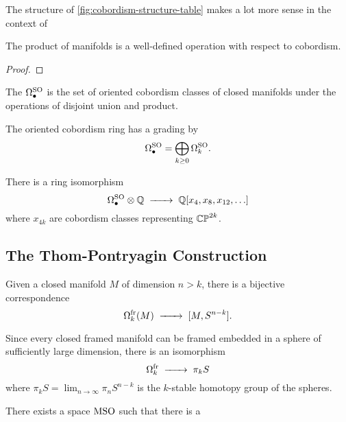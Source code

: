 The structure of \cref{fig:cobordism-structure-table} makes a lot more sense in the context of 

\begin{proposition}
	The product of manifolds is a well-defined operation with respect to cobordism.
\end{proposition}
\begin{proof}
\end{proof}

\begin{definition}
	The  $\Omega^{\mathrm{SO}}_\bullet$ is the set of oriented cobordism classes of closed manifolds under the operations of disjoint union and product.
\end{definition}

The oriented cobordism ring has a grading by
\[
	\Omega_\bullet^{\mathrm{SO}} = \bigoplus_{k\geq 0} \Omega^{\mathrm{SO}}_k.
\]

\begin{theorem}\label{thm:oriented-cobordism-structure}
	There is a ring isomorphism
	\[
		\Omega_\bullet^\SO \otimes \Q \lkxto \Q[x_4, x_8, x_{12}, \ldots]
	\]
	where $x_{4k}$ are cobordism classes representing $\mathbb{CP}^{2k}$.
\end{theorem}

\subsection{The Thom-Pontryagin Construction}

\begin{theorem}
	Given a closed manifold $M$ of dimension $n>k$, there is a bijective correspondence
	\begin{equation}
		\Omega^\fr_k(M) \lkxto[] [M, S^{n-k}].
	\end{equation}
\end{theorem}

\begin{corollary}
	Since every closed framed manifold can be framed embedded in a sphere of sufficiently large dimension, there is an isomorphism
	\begin{equation}
		\Omega^\fr_k \lkxto \pi_k S
	\end{equation}
	where $\pi_k S = \lim_{n\to\infty} \pi_n S^{n-k}$ is the $k$-stable homotopy group of the spheres.
\end{corollary}

\begin{theorem}
	There exists a space $\mathrm{MSO}$ such that there is a
\end{theorem}

